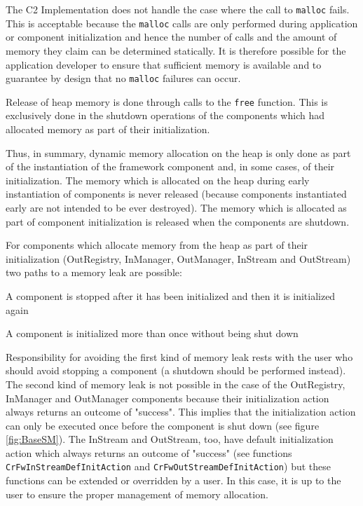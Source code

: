 \documentclass[a4paper,10pt]{article}
\newenvironment{fw_itemize}						%
{\begin{itemize}
  \setlength{\itemsep}{1mm}
  \setlength{\parskip}{0pt}
  \setlength{\parsep}{0pt}}
{\end{itemize}}
\begin{document}
The C2 Implementation does not handle the case where the call to \texttt{malloc} fails.  This is acceptable because the \texttt{malloc} calls are only performed during application or component initialization and hence the number of calls and the amount of memory they claim can be determined statically. It is therefore possible for the application developer to ensure that sufficient memory is available and to guarantee by design that no \texttt{malloc} failures can occur.

Release of heap memory is done through calls to the \texttt{free} function. This is exclusively done in the shutdown operations of the components which had allocated memory as part of their initialization. 

Thus, in summary, dynamic memory allocation on the heap is only done as part of the instantiation of the framework component and, in some cases, of their initialization. The memory which is allocated on the heap during early instantiation of components is never released (because components instantiated early are not intended to be ever destroyed). The memory which is allocated as part of component initialization is released when the components are shutdown.

For components which allocate memory from the heap as part of their initialization (OutRegistry, InManager, OutManager, InStream and OutStream) two paths to a memory leak are possible:

\begin{fw_itemize}
\item A component is stopped after it has been initialized and then it is initialized again
\item A component is initialized more than once without being shut down
\end{fw_itemize}

Responsibility for avoiding the first kind of memory leak rests with the user who should avoid stopping a component (a shutdown should be performed instead). The second kind of memory leak is not possible in the case of the OutRegistry, InManager and OutManager components because their initialization action always returns an outcome of "success". This implies that the initialization action can only be executed once before the component is shut down (see figure \ref{fig:BaseSM}). The InStream and OutStream, too, have default initialization action which always returns an outcome of "success" (see functions \texttt{CrFwInStreamDefInitAction} and \texttt{CrFwOutStreamDefInitAction}) but these functions can be extended or overridden by a user. In this case, it is up to the user to ensure the proper management of memory allocation. 
\end{document}
